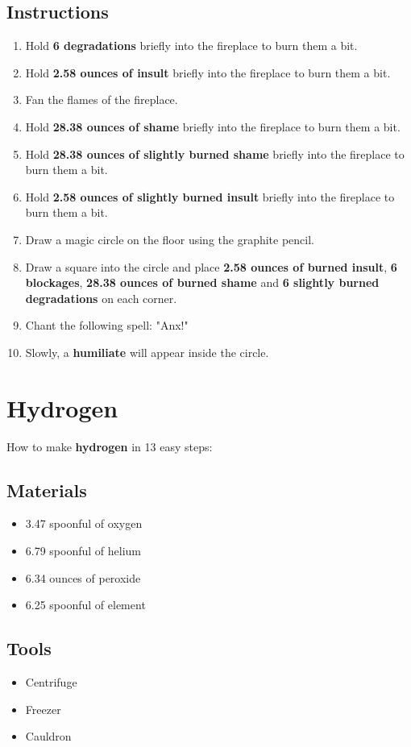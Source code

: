 \documentclass{article}
\begin{document}
\subsection{Instructions}\begin{enumerate}
\item 
Hold \textbf{6 degradations} briefly into the fireplace to burn them a bit.
\item 
Hold \textbf{2.58 ounces of insult} briefly into the fireplace to burn them a bit.
\item 
Fan the flames of the fireplace.
\item 
Hold \textbf{28.38 ounces of shame} briefly into the fireplace to burn them a bit.
\item 
Hold \textbf{28.38 ounces of slightly burned shame} briefly into the fireplace to burn them a bit.
\item 
Hold \textbf{2.58 ounces of slightly burned insult} briefly into the fireplace to burn them a bit.
\item 
Draw a magic circle on the floor using the graphite pencil.
\item 
Draw a square into the circle and place \textbf{2.58 ounces of burned insult}, \textbf{6 blockages}, \textbf{28.38 ounces of burned shame} and \textbf{6 slightly burned degradations} on each corner.
\item 
Chant the following spell: "Anx!"
\item 
Slowly, a \textbf{humiliate} will appear inside the circle.
\end{enumerate}
\newpage
\section{Hydrogen}How to make \textbf{hydrogen} in 13 easy steps:

\subsection{Materials}\begin{itemize}
\item 
3.47 spoonful of oxygen
\item 
6.79 spoonful of helium
\item 
6.34 ounces of peroxide
\item 
6.25 spoonful of element
\end{itemize}
\subsection{Tools}\begin{itemize}
\item 
Centrifuge
\item 
Freezer
\item 
Cauldron
\end{itemize}
\end{document}
